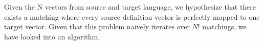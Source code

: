 Given the N vectors from source and target language, we hypothesize that there exists a matching where every source definition vector is perfectly mapped to one target vector.
Given that this problem naively iterates over $N!$ matchings, we have looked into an algorithm.

%

